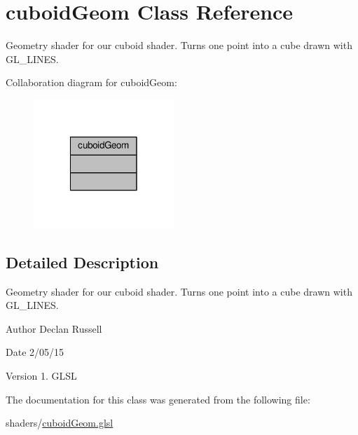 \hypertarget{classcuboid_geom}{\section{cuboid\-Geom Class Reference}
\label{classcuboid_geom}
}


Geometry shader for our cuboid shader. Turns one point into a cube drawn with G\-L\-\_\-\-L\-I\-N\-E\-S.  




Collaboration diagram for cuboid\-Geom\-:\nopagebreak
\begin{figure}[H]
\begin{center}
\leavevmode
\includegraphics[width=150pt]{classcuboid_geom__coll__graph}
\end{center}
\end{figure}


\subsection{Detailed Description}
Geometry shader for our cuboid shader. Turns one point into a cube drawn with G\-L\-\_\-\-L\-I\-N\-E\-S. 

\begin{DoxyAuthor}{Author}
Declan Russell 
\end{DoxyAuthor}
\begin{DoxyDate}{Date}
2/05/15 
\end{DoxyDate}
\begin{DoxyVersion}{Version}
1.  G\-L\-S\-L 
\end{DoxyVersion}


The documentation for this class was generated from the following file\-:\begin{DoxyCompactItemize}
\item 
shaders/\hyperlink{cuboid_geom_8glsl}{cuboid\-Geom.\-glsl}\end{DoxyCompactItemize}

